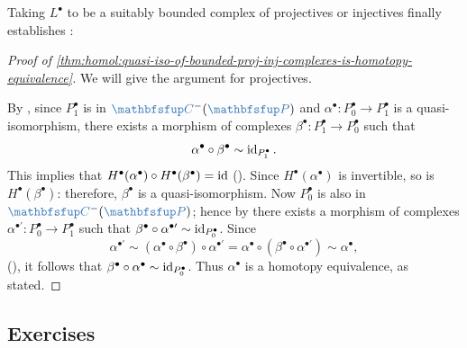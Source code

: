 Taking $L^\bullet$ to be a suitably bounded complex of projectives or
injectives finally establishes :

\begin{proof}[Proof of \cref{thm:homol:quasi-iso-of-bounded-proj-inj-complexes-is-homotopy-equivalence}]
  We will give the argument for projectives.

  By , since $P_1^\bullet$ is in
  $\categ{C}^-(\categ{P})$ and
  $\alpha^\bullet : P_0^\bullet \to P_1^\bullet$ is a
  quasi-isomorphism, there exists a morphism of complexes
  $\beta^\bullet : P_1^\bullet \to P_0^\bullet$ such that
  \[
    \alpha^\bullet \circ \beta^\bullet \sim \operatorname{id}_{P_1^\bullet}.
  \]
  This implies that
  $H^\bullet(\alpha^\bullet) \circ H^\bullet(\beta^\bullet) = \operatorname{id}$
  (). Since $H^\bullet(\alpha^\bullet)$ is
  invertible, so is $H^\bullet(\beta^\bullet)$: therefore,
  $\beta^\bullet$ is a quasi-isomorphism. Now $P_0^\bullet$ is also in
  $\categ{C}^-(\categ{P})$; hence by 
  there exists a morphism of complexes
  $\alpha^{\bullet\prime} : P_0^\bullet \to P_1^\bullet$ such that
  $\beta^\bullet \circ \alpha^{\bullet\prime} \sim
  \operatorname{id}_{P_0^\bullet}$. Since
  \[
    \alpha^{\bullet\prime} \sim (\alpha^\bullet \circ \beta^\bullet)
    \circ \alpha^{\bullet\prime} = \alpha^\bullet \circ (\beta^\bullet
    \circ \alpha^{\bullet\prime}) \sim \alpha^\bullet,
  \]
  (), it follows
  that $\beta^\bullet \circ \alpha^\bullet \sim
  \operatorname{id}_{P_0^\bullet}$. Thus $\alpha^\bullet$ is a homotopy equivalence,
  as stated.
\end{proof}

\subsection*{Exercises}

